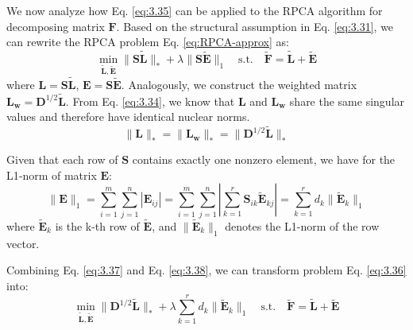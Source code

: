 \documentclass{article}
\begin{document}
We now analyze how Eq. \eqref{eq:3.35} can be applied to the RPCA algorithm for decomposing matrix $\mathbf{F}$. Based on the structural assumption in Eq. \eqref{eq:3.31}, we can rewrite the RPCA problem Eq. \eqref{eq:RPCA-approx} as:
\begin{equation}
    \min_{\tilde{\mathbf{L}}, \tilde{\mathbf{E}}} \|\mathbf{S} \tilde{\mathbf{L}}\|_* + \lambda \|\mathbf{S} \tilde{\mathbf{E}}\|_1 \quad \text{s.t.} \quad \tilde{\mathbf{F}} = \tilde{\mathbf{L}} + \tilde{\mathbf{E}}
    \label{eq:3.36}
\end{equation}
where $\mathbf{L} = \mathbf{S}\tilde{\mathbf{L}}$, $\mathbf{E} = \mathbf{S}\tilde{\mathbf{E}}$. Analogously, we construct the weighted matrix $\mathbf{L_w}=\mathbf{D}^{1/2} \tilde{\mathbf{L}}$. From Eq. \eqref{eq:3.34}, we know that $\mathbf{L}$ and $\mathbf{L_w}$ share the same singular values and therefore have identical nuclear norms.
\begin{equation}
    \|\mathbf{L}\|_* = \|\mathbf{L_w}\|_* = \|\mathbf{D}^{1/2} \tilde{\mathbf{L}}\|_*
    \label{eq:3.37}
\end{equation}

Given that each row of $\mathbf{S}$ contains exactly one nonzero element, we have for the L1‑norm of matrix $\mathbf{E}$:
\begin{equation}
    \|\mathbf{E}\|_1 = \sum_{i=1}^m \sum_{j=1}^n |\mathbf{E}_{ij}| = \sum_{i=1}^m \sum_{j=1}^n \left| \sum_{k=1}^r \mathbf{S}_{ik} \tilde{\mathbf{E}}_{kj} \right| = \sum_{k=1}^r d_k \|\tilde{\mathbf{E}}_{k}\|_1
    \label{eq:3.38}
\end{equation}
where $\tilde{\mathbf{E}}_{k}$ is the k-th row of $\tilde{\mathbf{E}}$, and $\|\tilde{\mathbf{E}}_{k}\|_1$ denotes the L1-norm of the row vector.

Combining Eq. \eqref{eq:3.37} and Eq. \eqref{eq:3.38}, we can transform problem Eq. \eqref{eq:3.36} into:
\begin{equation}
    \min_{\tilde{\mathbf{L}}, \tilde{\mathbf{E}}} \|\mathbf{D}^{1/2} \tilde{\mathbf{L}}\|_* + \lambda \sum_{k=1}^r d_k \|\tilde{\mathbf{E}}_{k}\|_1 \quad \text{s.t.} \quad \tilde{\mathbf{F}} = \tilde{\mathbf{L}} + \tilde{\mathbf{E}}
    \label{eq:3.39}
\end{equation}




\end{document}
